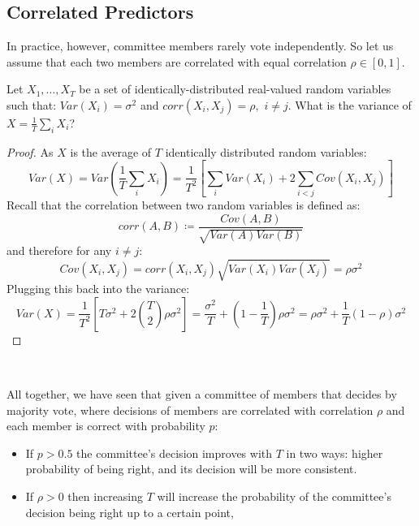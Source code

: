 
\subsection{Correlated Predictors}
In practice, however, committee members rarely vote independently. So let us assume that each two members are correlated with equal correlation $\rho\in\left[0,1\right]$.

\begin{exercise}
Let $X_1,\ldots,X_T$ be a set of identically-distributed real-valued random variables such that: $Var\left(X_i\right)=\sigma^2$ and $corr\left(X_i,X_j\right)=\rho,\,\, i\neq j$. What is the variance of $X=\frac{1}{T}\sum_i X_i$?
\end{exercise}
\begin{proof}
As $X$ is the average of $T$ identically distributed random variables:
$$ Var\left(X\right)=Var\left(\frac{1}{T}\sum_i X_i\right)=\frac{1}{T^2}\left[\sum_i Var\left(X_i\right)+2\sum_{i<j}Cov\left(X_i,X_j\right)\right] $$
Recall that the correlation between two random variables is defined as: $$ corr\left(A,B\right)\coloneqq\frac{Cov\left(A,B\right)}{\sqrt{Var\left(A\right)Var\left(B\right)}} $$
and therefore for any $i\neq j$: $$ Cov\left(X_i,X_j\right)=corr\left(X_i,X_j\right)\sqrt{Var\left(X_i\right)Var\left(X_j\right)}=\rho\sigma^2 $$
Plugging this back into the variance:
$$ Var\left(X\right)= \frac{1}{T^2}\left[T\sigma^2+2{T \choose 2}\rho\sigma^2\right]=\frac{\sigma^2}{T}+\left(1-\frac{1}{T}\right)\rho\sigma^2=\rho\sigma^2+\frac{1}{T}\left(1-\rho\right)\sigma^2$$
\end{proof}

\\

All together, we have seen that given a committee of members that decides by majority vote, where decisions of members are correlated with correlation $\rho$ and each member is correct with probability $p$:
\begin{itemize}
	\item If $p>0.5$ the committee's decision improves with $T$ in two ways: higher probability of being right, and its decision will be more consistent.
	\item If $\rho>0$ then increasing $T$ will increase the probability of the committee's decision being right up to a certain point,
\end{itemize}


